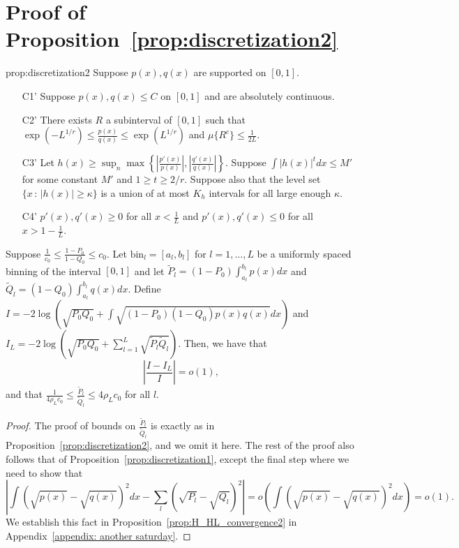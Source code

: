 \documentclass{article}
\newcommand{\bin}{\text{bin}}
\begin{document}










\section{Proof of Proposition~\ref{prop:discretization2}}

\begin{repproposition}{prop:discretization2}
Suppose $p(x), q(x)$ are supported on $[0,1]$.

\begin{enumerate}
\item[C1'] Suppose $p(x), q(x) \leq C$ on $[0,1]$ and are absolutely continuous.
\item[C2'] There exists $R$ a subinterval of $[0,1]$ such that $\exp(-L^{1/r}) \leq \frac{p(x)}{q(x)} \leq \exp(L^{1/r})$ and $\mu\{ R^c \} \leq \frac{1}{2L}$.
\item[C3'] Let $h(x) \geq \sup_n \max \left\{  \left|\frac{p'(x)}{p(x)} \right|, 
 \left|\frac{q'(x)}{q(x)}\right|  \right\} $. Suppose $\int |h(x)|^t dx \leq M'$ for some constant $M'$ and $1 \geq t \geq 2/r$. Suppose also that the level set $\{x \,:\, |h(x)| \geq \kappa\}$ is a union of at most $K_h$ intervals for all large enough $\kappa$.  
\item[C4']  $p'(x), q'(x) \geq 0$ for all $x < \frac{1}{L}$ and $ p'(x), q'(x) \leq 0$ for all $x > 1-\frac{1}{L}$. 
\end{enumerate}
Suppose $\frac{1}{c_0} \leq \frac{1 - P_0}{1-Q_0} \leq c_0$. Let $\bin_l = [a_l, b_l]$ for $l=1,...,L$ be a uniformly spaced binning of the interval $[0,1]$ and let $\tilde P_l = (1- P_0) \int_{a_l}^{b_l} p(x) dx$ and $\tilde Q_l = (1-Q_0)\int_{a_l}^{b_l} q(x) dx$. Define $I = -2 \log \left( \sqrt{P_0 Q_0} + \int \sqrt{(1-P_0)(1-Q_0) p(x) q(x)} dx \right)$ and $I_L = -2 \log \left( \sqrt{P_0 Q_0} + \sum_{l=1}^L \sqrt{\tilde P_l \tilde Q_l} \right)$. Then, we have that
 $$\left| \frac{I - I_L}{I} \right| = o(1),$$ 
and that $\frac{1}{4\rho_L c_0} \leq \frac{\tilde P_l}{\tilde Q_l} \leq 4\rho_L c_0$ for all $l$. 
\end{repproposition}

\begin{proof}
The proof of bounds on $\frac{\tilde P_l}{\tilde Q_l}$ is exactly as in Proposition~\ref{prop:discretization2}, and we omit it here. The rest of the proof also follows that of Proposition~\ref{prop:discretization1}, except the final step where we need to show that
$$\left| \int (\sqrt{p(x)} - \sqrt{q(x)})^2 dx - \sum_l (\sqrt{P_l} - \sqrt{Q_l})^2 \right| = o(\int (\sqrt{p(x)} - \sqrt{q(x)})^2 dx) = o(1).$$
We establish this fact in Proposition~\ref{prop:H_HL_convergence2} in Appendix~\ref{appendix: another saturday}.
\end{proof}
\end{document}
